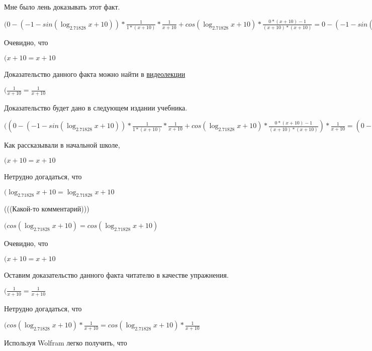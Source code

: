 \documentclass[12pt,a4paper,fleqn]{article}
\theoremstyle{definition}
\begin{document}
Мне было лень доказывать этот факт.

$( 0  - ( -1  - sin(\log_{ 2.71828 }{ x  +  10 })) * \frac{ 1 }{ 1  * ( x  +  10 )}
 * \frac{ 1 }{ x  +  10 }
 + cos(\log_{ 2.71828 }{ x  +  10 }) * \frac{ 0  * ( x  +  10 ) -  1 }{( x  +  10 ) * ( x  +  10 )}
 =  0  - ( -1  - sin(\log_{ 2.71828 }{ x  +  10 })) * \frac{ 1 }{ 1  * ( x  +  10 )}
 * \frac{ 1 }{ x  +  10 }
 + cos(\log_{ 2.71828 }{ x  +  10 }) * \frac{ 0  * ( x  +  10 ) -  1 }{( x  +  10 ) * ( x  +  10 )}
$

Очевидно, что

$( x  +  10  =  x  +  10 $

Доказательство данного факта можно найти в \href{https://www.youtube.com/watch?v=dQw4w9WgXcQ}{видеолекции}

$(\frac{ 1 }{ x  +  10 }
 = \frac{ 1 }{ x  +  10 }
$

Доказательство будет дано в следующем издании учебника.

$(( 0  - ( -1  - sin(\log_{ 2.71828 }{ x  +  10 })) * \frac{ 1 }{ 1  * ( x  +  10 )}
 * \frac{ 1 }{ x  +  10 }
 + cos(\log_{ 2.71828 }{ x  +  10 }) * \frac{ 0  * ( x  +  10 ) -  1 }{( x  +  10 ) * ( x  +  10 )}
) * \frac{ 1 }{ x  +  10 }
 = ( 0  - ( -1  - sin(\log_{ 2.71828 }{ x  +  10 })) * \frac{ 1 }{ 1  * ( x  +  10 )}
 * \frac{ 1 }{ x  +  10 }
 + cos(\log_{ 2.71828 }{ x  +  10 }) * \frac{ 0  * ( x  +  10 ) -  1 }{( x  +  10 ) * ( x  +  10 )}
) * \frac{ 1 }{ x  +  10 }
$

Как рассказывали в начальной школе,

$( x  +  10  =  x  +  10 $

Нетрудно догадаться, что

$(\log_{ 2.71828 }{ x  +  10 } = \log_{ 2.71828 }{ x  +  10 }$

(((Какой-то комментарий)))

$(cos(\log_{ 2.71828 }{ x  +  10 }) = cos(\log_{ 2.71828 }{ x  +  10 })$

Очевидно, что

$( x  +  10  =  x  +  10 $

Оставим доказательство данного факта читателю в качестве упражнения.

$(\frac{ 1 }{ x  +  10 }
 = \frac{ 1 }{ x  +  10 }
$

Нетрудно догадаться, что

$(cos(\log_{ 2.71828 }{ x  +  10 }) * \frac{ 1 }{ x  +  10 }
 = cos(\log_{ 2.71828 }{ x  +  10 }) * \frac{ 1 }{ x  +  10 }
$

Используя Wolfram легко получить, что
\end{document}
